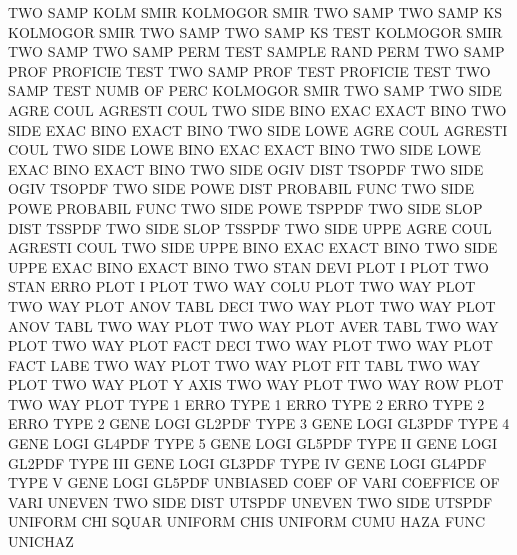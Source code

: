 TWO      SAMP KOLM SMIR                 KOLMOGOR SMIR TWO  SAMP
TWO      SAMP KS                        KOLMOGOR SMIR TWO  SAMP
TWO      SAMP KS   TEST                 KOLMOGOR SMIR TWO  SAMP
TWO      SAMP PERM TEST                 SAMPLE   RAND PERM
TWO      SAMP PROF                      PROFICIE TEST
TWO      SAMP PROF TEST                 PROFICIE TEST
TWO      SAMP TEST NUMB OF   PERC       KOLMOGOR SMIR TWO  SAMP
TWO      SIDE AGRE COUL                 AGRESTI  COUL
TWO      SIDE BINO EXAC                 EXACT    BINO
TWO      SIDE EXAC BINO                 EXACT    BINO
TWO      SIDE LOWE AGRE COUL            AGRESTI  COUL
TWO      SIDE LOWE BINO EXAC            EXACT    BINO
TWO      SIDE LOWE EXAC BINO            EXACT    BINO
TWO      SIDE OGIV DIST                 TSOPDF
TWO      SIDE OGIV                      TSOPDF
TWO      SIDE POWE DIST                 PROBABIL FUNC
TWO      SIDE POWE                      PROBABIL FUNC
TWO      SIDE POWE                      TSPPDF
TWO      SIDE SLOP DIST                 TSSPDF
TWO      SIDE SLOP                      TSSPDF
TWO      SIDE UPPE AGRE COUL            AGRESTI  COUL
TWO      SIDE UPPE BINO EXAC            EXACT    BINO
TWO      SIDE UPPE EXAC BINO            EXACT    BINO
TWO      STAN DEVI PLOT                 I        PLOT
TWO      STAN ERRO PLOT                 I        PLOT
TWO      WAY  COLU PLOT                 TWO      WAY  PLOT
TWO      WAY  PLOT ANOV TABL DECI       TWO      WAY  PLOT
TWO      WAY  PLOT ANOV TABL            TWO      WAY  PLOT
TWO      WAY  PLOT AVER TABL            TWO      WAY  PLOT
TWO      WAY  PLOT FACT DECI            TWO      WAY  PLOT
TWO      WAY  PLOT FACT LABE            TWO      WAY  PLOT
TWO      WAY  PLOT FIT  TABL            TWO      WAY  PLOT
TWO      WAY  PLOT Y    AXIS            TWO      WAY  PLOT
TWO      WAY  ROW  PLOT                 TWO      WAY  PLOT
TYPE     1    ERRO                      TYPE     1    ERRO
TYPE     2    ERRO                      TYPE     2    ERRO
TYPE     2    GENE LOGI                 GL2PDF
TYPE     3    GENE LOGI                 GL3PDF
TYPE     4    GENE LOGI                 GL4PDF
TYPE     5    GENE LOGI                 GL5PDF
TYPE     II   GENE LOGI                 GL2PDF
TYPE     III  GENE LOGI                 GL3PDF
TYPE     IV   GENE LOGI                 GL4PDF
TYPE     V    GENE LOGI                 GL5PDF
UNBIASED COEF OF   VARI                 COEFFICE OF   VARI
UNEVEN   TWO  SIDE DIST                 UTSPDF
UNEVEN   TWO  SIDE                      UTSPDF
UNIFORM  CHI  SQUAR                     UNIFORM  CHIS
UNIFORM  CUMU HAZA FUNC                 UNICHAZ

